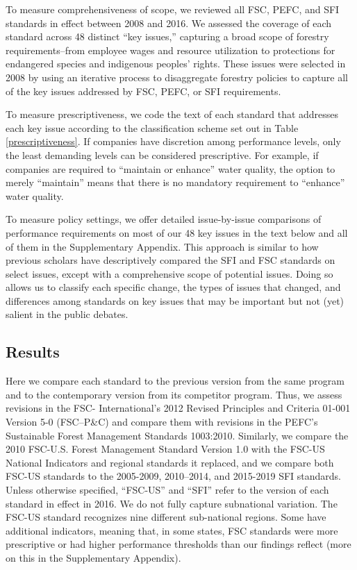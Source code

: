 \documentclass[
      12pt,
            Review ]{article}
\begin{document}
To measure comprehensiveness of scope, we reviewed all FSC, PEFC, and SFI standards in effect between 2008 and 2016. We assessed the coverage of each standard across 48 distinct ``key issues,'' capturing a broad scope of forestry requirements--from employee wages and resource utilization to protections for endangered species and indigenous peoples' rights. These issues were selected in 2008 by \citet{McDermott2010} using an iterative process to disaggregate forestry policies to capture all of the key issues addressed by FSC, PEFC, or SFI requirements.

To measure prescriptiveness, we code the text of each standard that addresses each key issue according to the classification scheme set out in Table \ref{prescriptiveness}. If companies have discretion among performance levels, only the least demanding levels can be considered prescriptive. For example, if companies are required to ``maintain or enhance'' water quality, the option to merely ``maintain'' means that there is no mandatory requirement to ``enhance'' water quality.

To measure policy settings, we offer detailed issue-by-issue comparisons of performance requirements on most of our 48 key issues in the text below and all of them in the Supplementary Appendix. This approach is similar to how previous scholars have descriptively compared the SFI and FSC standards on select issues, except with a comprehensive scope of potential issues. Doing so allows us to classify each specific change, the types of issues that changed, and differences among standards on key issues that may be important but not (yet) salient in the public debates.

\hypertarget{results}{%
\subsection{Results}\label{results}}

Here we compare each standard to the previous version from the same program and to the contemporary version from its competitor program. Thus, we assess revisions in the FSC- International's 2012 Revised Principles and Criteria 01-001 Version 5-0 (FSC--P\&C) and compare them with revisions in the PEFC's Sustainable Forest Management Standards 1003:2010. Similarly, we compare the 2010 FSC-U.S. Forest Management Standard Version 1.0 with the FSC-US National Indicators and regional standards it replaced, and we compare both FSC-US standards to the 2005-2009, 2010--2014, and 2015-2019 SFI standards. Unless otherwise specified, ``FSC-US'' and ``SFI'' refer to the version of each standard in effect in 2016. We do not fully capture subnational variation. The FSC-US standard recognizes nine different sub-national regions. Some have additional indicators, meaning that, in some states, FSC standards were more prescriptive or had higher performance thresholds than our findings reflect (more on this in the Supplementary Appendix).
\end{document}

